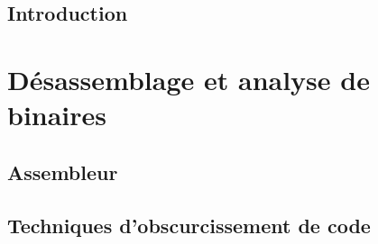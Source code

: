 
\WritePartLabelInToc
\WriteChapterLabelInToc


{}
\setcounter{tocdepth}{2}
\tableofcontents





\DontWriteThisInToc   
\listoffigures


\mainmatter

\DontFrameThisInToc
\NumberThisInToc
\chapter{Introduction\label{chap:introduction}}


\part{Désassemblage et analyse de binaires}

\DontFrameThisInToc
\chapter{Assembleur\label{chap:assembleur}}


\DontFrameThisInToc
\chapter{Techniques d'obscurcissement de code\label{chap:obscurcissement}}


